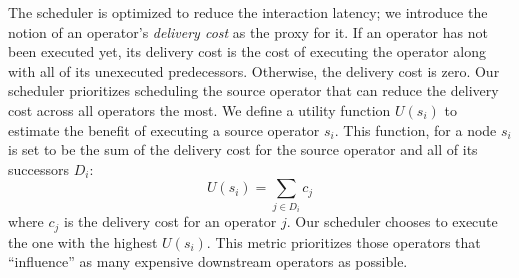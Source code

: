 The scheduler is optimized to reduce the interaction latency; we introduce
the notion of an operator's \textit{delivery cost} as the proxy for it. 
If an operator has not been executed yet, its delivery cost is the cost of executing the operator along with all of its unexecuted predecessors. 
Otherwise, the delivery cost is zero.
Our scheduler prioritizes scheduling the source operator that can reduce the delivery cost across all operators the most. 
We define a utility function $U(s_i)$ to estimate the benefit of executing a source operator $s_i$.
This function, for a node $s_i$ 
is set to be the sum of the delivery cost 
for the source operator and all of its successors $D_i$:
\begin{equation}
\label{eq:utility}
U(s_i) = \sum_{j \in D_i}{c_j}
\end{equation}
where $c_j$ is the delivery cost for an operator $j$.
Our scheduler chooses to execute the one with the highest $U(s_i)$.
This metric prioritizes those operators that ``influence'' as many 
expensive downstream
operators as possible.

